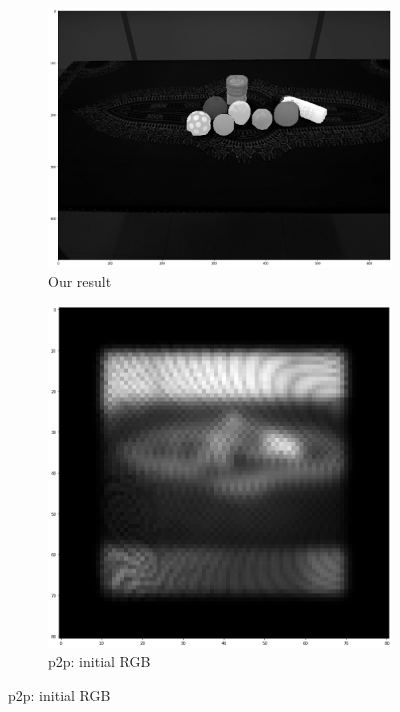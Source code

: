 \begin{figure}
\begin{subfigure}[t]{0.16\linewidth}
        \includegraphics[width=\textwidth]{figures/methods5.png}
        \caption{Our result}
        \label{methods:pic5}
    \end{subfigure}
    \newline
    \begin{subfigure}[t]{0.16\linewidth}
        \centering
        \includegraphics[width=\textwidth]{figures/methods6.png}
        \caption{p2p: initial RGB}
        \label{methods:pic6}

\end{subfigure}
\end{figure}
